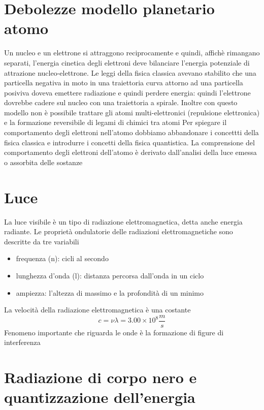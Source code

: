 \documentclass[a4paper,11pt]{report}
\begin{document}
\section{Debolezze modello planetario atomo}

Un nucleo e un elettrone si attraggono reciprocamente e quindi, affichè rimangano separati, l'energia cinetica degli elettroni deve bilanciare l'energia potenziale di attrazione nucleo-elettrone. Le leggi della fisica classica avevano stabilito che una particella negativa in moto in una traiettoria curva attorno ad una particella posiviva doveva emettere radiazione e quindi perdere energia: quindi l'elettrone dovrebbe cadere sul nucleo con una traiettoria a spirale. Inoltre con questo modello non è possibile trattare gli atomi multi-elettronici (repulsione elettronica) e la formazione reversibile di legami di chimici tra atomi \newline
Per spiegare il comportamento degli elettroni nell'atomo dobbiamo abbandonare i concettti della fisica classica e introdurre i concetti della fisica quantistica. La comprensione del comportamento degli elettroni dell'atomo è derivato dall'analisi della luce emessa o assorbita delle sostanze

\section{Luce}

La luce visibile è un tipo di radiazione elettromagnetica, detta anche energia radiante. Le proprietà ondulatorie delle radiazioni elettromagnetiche sono descritte da tre variabili
\begin{itemize}
	\item frequenza (n): cicli al secondo
	\item lunghezza d'onda (l): distanza percorsa dall'onda in un ciclo
	\item ampiezza: l'altezza di massimo e la profondità di un minimo
\end{itemize}
La velocità della radiazione elettromagnetica è una costante
\begin{equation*}
	c = \nu \lambda = 3.00 \times 10^8 \frac{m}{s}
\end{equation*}
Fenomeno importante che riguarda le onde è la formazione di figure di interferenza

\section{Radiazione di corpo nero e quantizzazione dell'energia}
\end{document}
